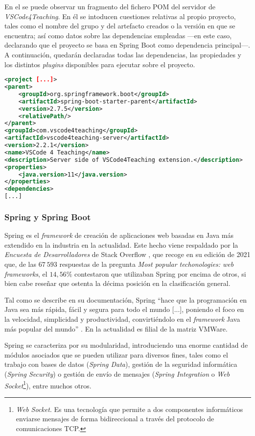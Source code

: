 En el  se puede observar un fragmento del fichero POM del servidor de \textit{VSCode4Teaching}. En él se intoducen cuestiones relativas al propio proyecto, tales como el nombre del grupo y del artefacto creados o la versión en que se encuentra; así como datos sobre las dependencias empleadas ---en este caso, declarando que el proyecto se basa en Spring Boot como dependencia principal---. A continuación, quedarán declaradas todas las dependencias, las propiedades y los distintos \textit{plugins} disponibles para ejecutar sobre el proyecto.

\begin{lstlisting}[language=XML,caption={Fragmento del POM del servidor.},label=cod:fragmentoPOM]
<project [...]>
<parent>
    <groupId>org.springframework.boot</groupId>
    <artifactId>spring-boot-starter-parent</artifactId>
    <version>2.7.5</version>
    <relativePath/>
</parent>
<groupId>com.vscode4teaching</groupId>
<artifactId>vscode4teaching-server</artifactId>
<version>2.2.1</version>
<name>VSCode 4 Teaching</name>
<description>Server side of VSCode4Teaching extension.</description>
<properties>
    <java.version>11</java.version>
</properties>
<dependencies>
[...]
\end{lstlisting}

\subsubsection{Spring y Spring Boot}
\label{subsec:spring}
Spring es el \textit{framework} de creación de aplicaciones web basadas en Java más extendido en la industria en la actualidad. Este hecho viene respaldado por la \textit{Encuesta de Desarrolladores} de Stack Overflow \cite{Tec_Encuesta_StackOverflow}, que recoge en su edición de 2021 que, de las $67\ 593$ respuestas de la pregunta \textit{Most popular techonologies: web frameworks}, el $14,56\%$ contestaron que utilizaban Spring por encima de otros, si bien cabe reseñar que ostenta la décima posición en la clasificación general. 

Tal como se describe en su documentación, Spring ``hace que la programación en Java sea más rápida, fácil y segura para todo el mundo [...], poniendo el foco en la velocidad, simplicidad y productividad, convirtiéndolo en el \textit{framework} Java más popular del mundo'' \cite{Tec_Spring}. En la actualidad es filial de la matriz VMWare.

Spring se caracteriza por su modularidad, introduciendo una enorme cantidad de módulos asociados que se pueden utilizar para diversos fines, tales como el trabajo con bases de datos (\textit{Spring Data}), gestión de la seguridad informática (\textit{Spring Security}) o gestión de envío de mensajes (\textit{Spring Integration} o \textit{Web Socket}\footnote{\textit{Web Socket}. Es una tecnología que permite a dos componentes informáticos enviarse mensajes de forma bidireccional a través del protocolo de comunicaciones TCP.}), entre muchos otros.

